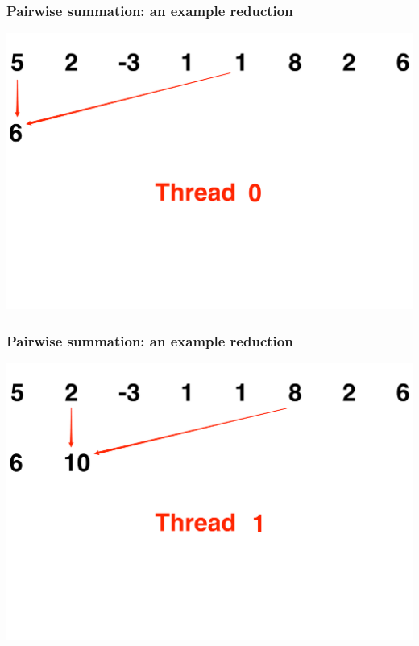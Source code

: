 \documentclass[handout]{beamer}
\numberwithin{equation}{section}
\begin{document}
\begin{frame}
\frametitle{Pairwise summation: an example reduction}
\includegraphics[scale=.15]{fig/psum1.pdf}
\end{frame}

\begin{frame}
\frametitle{Pairwise summation: an example reduction}
\includegraphics[scale=.15]{fig/psum2.pdf}
\end{frame}
\end{document}
